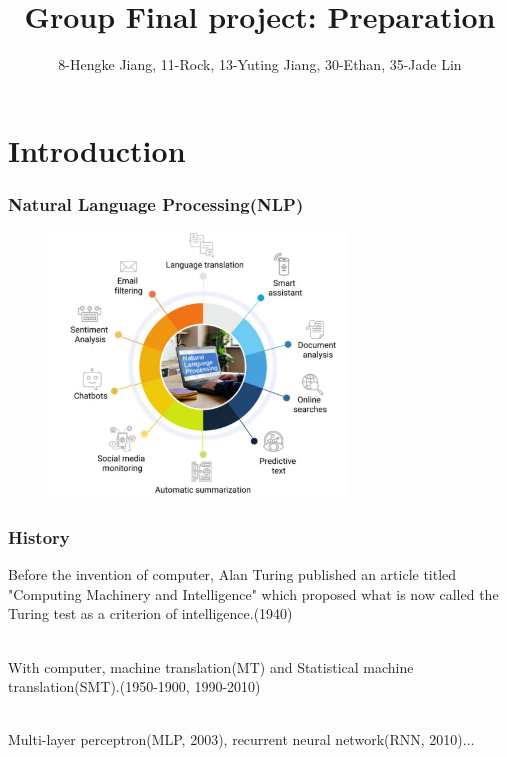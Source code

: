 \documentclass{beamer}
\title[Final project] 
{Group Final project: Preparation}
\author{8-Hengke Jiang, 11-Rock, 13-Yuting Jiang, 30-Ethan, 35-Jade Lin}
\institute[] %
{ 
  {linyh63@mail2.sysu.edu.cn}
}
\date[6.30.2024] %
\begin{document}
\frame{\titlepage}
\section{Introduction}
\begin{frame}
  \frametitle{Natural Language Processing(NLP)}
  
  \begin{figure}[H]
    \centering
    \includegraphics[width=8cm]{pictures/屏幕截图 2024-06-30 163118.png}
  \end{figure}

\end{frame}
\begin{frame}
  \frametitle{History}
  Before the invention of computer, Alan Turing published an article titled "Computing Machinery and Intelligence" which proposed what is now called the Turing test as a criterion of intelligence.(1940)\\\

  With computer, machine translation(MT) and Statistical machine translation(SMT).(1950-1900, 1990-2010)\\\

  Multi-layer perceptron(MLP, 2003), recurrent neural network(RNN, 2010)...
\end{frame}
\end{document}
